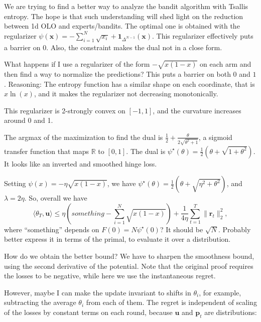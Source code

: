 \documentclass{article}
\newcommand{\field}[1]{\mathbb{#1}}
\newcommand{\R}{\field{R}}
\newcommand{\bu}{\boldsymbol{u}}
\newcommand{\bp}{\boldsymbol{p}}
\newcommand{\bx}{\boldsymbol{x}}
\newcommand{\br}{\boldsymbol{r}}
\begin{document}
We are trying to find a better way to analyze the bandit algorithm with Tsallis entropy. The hope is that such understanding will shed light on the reduction between 1d OLO and experts/bandits.
The optimal one is obtained with the regularizer $\psi(\bx)=-\sum_{i=1}^N \sqrt{x_i}+\boldsymbol{1}_{\Delta^{N-1}}(\bx)$. This regularizer effectively puts a barrier on 0. Also, the constraint makes the dual not in a close form.

What happens if I use a regularizer of the form $-\sqrt{x(1-x)}$ on each arm and then find a way to normalize the predictions? This puts a barrier on both $0$ and $1$. Reasoning: The entropy function has a similar shape on each coordinate, that is $x \ln(x)$, and it makes the regularizer not decreasing monotonically.

This regularizer is 2-strongly convex on $[-1,1]$, and the curvature increases around 0 and 1.

The argmax of the maximization to find the dual is $\frac{1}{2}+\frac{\theta}{2\sqrt{\theta^2+1}}$, a sigmoid transfer function that maps $\R$ to $[0,1]$.
The dual is $\psi^\star(\theta)=\frac{1}{2} \left(\theta + \sqrt{1 + \theta^2} \right)$. It looks like an inverted and smoothed hinge loss.


Setting $\psi(x)=-\eta\sqrt{x(1-x)}$, we have $ \psi^\star(\theta) = \frac{1}{2} \left(\theta + \sqrt{\eta^2+\theta^2}\right)$, and $\lambda = 2\eta$.
So, overall we have
\[
\langle \theta_T,\bu\rangle
\leq \eta\left(something-\sum_{i=1}^N \sqrt{x(1-x)}\right)+\frac{1}{4\eta}\sum_{t=1}^T \|\br_t\|^2_2,
\]
where ``something'' depends on $F(0)=N \psi^\star(0)$? It should be $\sqrt{N}$. Probably better express it in terms of the primal, to evaluate it over a distribution.

How do we obtain the better bound? We have to sharpen the smoothness bound, using the second derivative of the potential. Note that the original proof requires the losses to be negative, while here we use the instantaneous regret.

However, maybe I can make the update invariant to shifts in $\theta_i$, for example, subtracting the average $\theta_i$ from each of them.
The regret is independent of scaling of the losses by constant terms on each round, because $\bu$ and $\bp_t$ are distributions:
\end{document}
